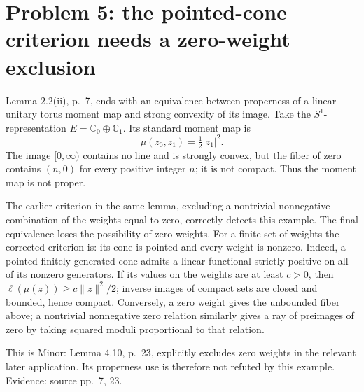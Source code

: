 \documentclass[10pt]{article}
\begin{document}
\section*{Problem 5: the pointed-cone criterion needs a zero-weight exclusion}
Lemma 2.2(ii), p. 7, ends with an equivalence between properness of a linear unitary torus moment map and strong convexity of its image. Take the \(S^1\)-representation \(E=\mathbb C_0\oplus\mathbb C_1\). Its standard moment map is \[\mu(z_0,z_1)=\tfrac12|z_1|^2 .\] The image \([0,\infty)\) contains no line and is strongly convex, but the fiber of zero contains \((n,0)\) for every positive integer \(n\); it is not compact. Thus the moment map is not proper.\par
The earlier criterion in the same lemma, excluding a nontrivial nonnegative combination of the weights equal to zero, correctly detects this example. The final equivalence loses the possibility of zero weights. For a finite set of weights the corrected criterion is: its cone is pointed and every weight is nonzero. Indeed, a pointed finitely generated cone admits a linear functional strictly positive on all of its nonzero generators. If its values on the weights are at least \(c>0\), then \(\ell(\mu(z))\geq c\|z\|^2/2\); inverse images of compact sets are closed and bounded, hence compact. Conversely, a zero weight gives the unbounded fiber above; a nontrivial nonnegative zero relation similarly gives a ray of preimages of zero by taking squared moduli proportional to that relation.\par
This is Minor: Lemma 4.10, p. 23, explicitly excludes zero weights in the relevant later application. Its properness use is therefore not refuted by this example. Evidence: source pp. 7, 23.\par
\end{document}
